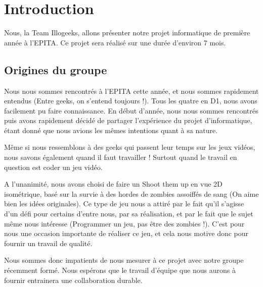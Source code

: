 \documentclass{article}
\begin{document}
\newpage
\thispagestyle{empty}
\tableofcontents



\newpage
\fontsize{12}{12}
\section{Introduction}

\par
Nous, la Team Illogeeks, allons présenter notre projet informatique de première année à l'EPITA. Ce projet sera réalisé sur une durée d'environ 7 mois.
\newline


\subsection{Origines du groupe}

\par
Nous nous sommes rencontrés à l'EPITA cette année, et nous sommes rapidement entendus (Entre geeks, on s'entend toujours !). Tous les quatre en D1, nous avons facilement pu faire connaissance. En début d'année, nous nous sommes rencontrés puis avons rapidement décidé de partager l'expérience du projet d'informatique, étant donné que nous avions les mêmes intentions quant à sa nature.
\newline

\par
Même si nous ressemblons à des geeks qui passent leur temps sur les jeux vidéos, nous savons également quand il faut travailler ! Surtout quand le travail en question est coder un jeu vidéo.
\newline

\par
A l'unanimité, nous avons choisi de faire un Shoot them up en vue 2D isométrique, basé sur la survie à des hordes de zombies assoiffés de sang (On aime bien les idées originales). Ce type de jeu nous a attiré par le fait qu'il s'agisse d'un défi pour certains d'entre nous, par sa réalisation, et par le fait que le sujet même nous intéresse (Programmer un jeu, pas être des zombies !). C'est pour nous une occasion importante de réaliser ce jeu, et cela nous motive donc pour fournir un travail de qualité.
\newline

\par
Nous sommes donc impatients de nous mesurer à ce projet avec notre groupe récemment formé. Nous espérons que le travail d'équipe que nous aurons à fournir entrainera une collaboration durable.
\end{document}
